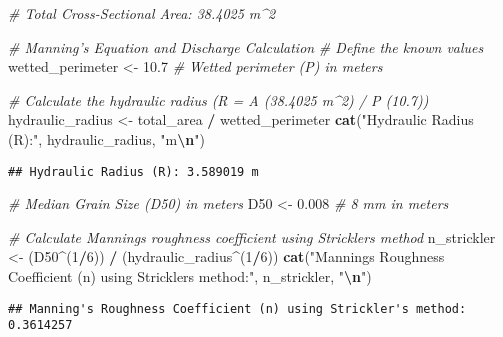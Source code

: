 \documentclass[
]{article}
\newenvironment{Shaded}{\begin{snugshade}}{\end{snugshade}}
\newcommand{\CommentTok}[1]{\textcolor[rgb]{0.56,0.35,0.01}{\textit{#1}}}
\newcommand{\DecValTok}[1]{\textcolor[rgb]{0.00,0.00,0.81}{#1}}
\newcommand{\FloatTok}[1]{\textcolor[rgb]{0.00,0.00,0.81}{#1}}
\newcommand{\FunctionTok}[1]{\textcolor[rgb]{0.13,0.29,0.53}{\textbf{#1}}}
\newcommand{\NormalTok}[1]{#1}
\newcommand{\OtherTok}[1]{\textcolor[rgb]{0.56,0.35,0.01}{#1}}
\newcommand{\SpecialCharTok}[1]{\textcolor[rgb]{0.81,0.36,0.00}{\textbf{#1}}}
\newcommand{\StringTok}[1]{\textcolor[rgb]{0.31,0.60,0.02}{#1}}
\begin{document}
\begin{Shaded}
\begin{Highlighting}[]
\CommentTok{\# Total Cross{-}Sectional Area: 38.4025 m\^{}2}
\end{Highlighting}
\end{Shaded}

\begin{Shaded}
\begin{Highlighting}[]
\CommentTok{\# Manning’s Equation and Discharge Calculation}
\CommentTok{\# Define the known values}
\NormalTok{wetted\_perimeter }\OtherTok{\textless{}{-}} \FloatTok{10.7}  \CommentTok{\# Wetted perimeter (P) in meters}

\CommentTok{\# Calculate the hydraulic radius (R = A (38.4025 m\^{}2) / P (10.7))}
\NormalTok{hydraulic\_radius }\OtherTok{\textless{}{-}}\NormalTok{ total\_area }\SpecialCharTok{/}\NormalTok{ wetted\_perimeter}
\FunctionTok{cat}\NormalTok{(}\StringTok{"Hydraulic Radius (R):"}\NormalTok{, hydraulic\_radius, }\StringTok{"m}\SpecialCharTok{\textbackslash{}n}\StringTok{"}\NormalTok{)}
\end{Highlighting}
\end{Shaded}

\begin{verbatim}
## Hydraulic Radius (R): 3.589019 m
\end{verbatim}

\begin{Shaded}
\begin{Highlighting}[]
\CommentTok{\# Median Grain Size (D50) in meters}
\NormalTok{D50 }\OtherTok{\textless{}{-}} \FloatTok{0.008}  \CommentTok{\# 8 mm in meters}

\CommentTok{\# Calculate Manning\textquotesingle{}s roughness coefficient using Strickler\textquotesingle{}s method}
\NormalTok{n\_strickler }\OtherTok{\textless{}{-}}\NormalTok{ (D50}\SpecialCharTok{\^{}}\NormalTok{(}\DecValTok{1}\SpecialCharTok{/}\DecValTok{6}\NormalTok{)) }\SpecialCharTok{/}\NormalTok{ (hydraulic\_radius}\SpecialCharTok{\^{}}\NormalTok{(}\DecValTok{1}\SpecialCharTok{/}\DecValTok{6}\NormalTok{))}
\FunctionTok{cat}\NormalTok{(}\StringTok{"Manning\textquotesingle{}s Roughness Coefficient (n) using Strickler\textquotesingle{}s method:"}\NormalTok{, n\_strickler, }\StringTok{"}\SpecialCharTok{\textbackslash{}n}\StringTok{"}\NormalTok{)}
\end{Highlighting}
\end{Shaded}

\begin{verbatim}
## Manning's Roughness Coefficient (n) using Strickler's method: 0.3614257
\end{verbatim}
\end{document}
